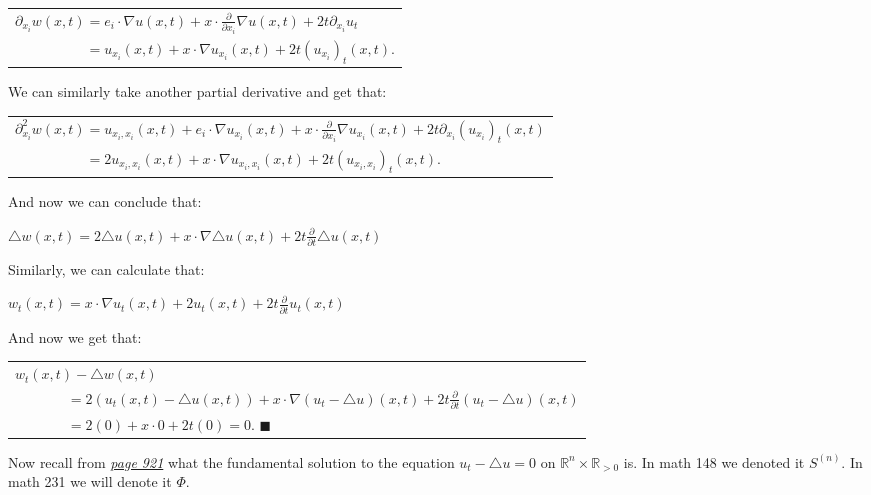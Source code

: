 \documentclass{book}
\newcommand{\inLinkRap}[2]{{\color{blue}\hyperlink{#1}{\textit{#2}}}}
\newcommand{\hTwo}{%
\color{Black}%
   \fontsize{13}{15}\selectfont%
}
\newenvironment{myIndent}{%
   \begin{adjustwidth}{2.5em}{0em}%
}{%
   \end{adjustwidth}%
}
\newcommand{\retTwo}{\hfill\bigbreak}
\begin{document}
\begin{enumerate}
\begin{myIndent}
		{\centering\begin{tabular}{l}
			$\partial_{x_i} w(x, t) = e_i \cdot \nabla u(x, t) + x \cdot \frac{\partial}{\partial x_i}\nabla u(x, t) + 2t\partial_{x_i} u_t$\\ [4pt]
			$\phantom{\partial_{x_i} w(x, t)} = u_{x_i}(x, t) + x \cdot \nabla u_{x_i}(x, t) + 2t(u_{x_i})_t(x, t)$.
		\end{tabular} \retTwo\par}

		We can similarly take another partial derivative and get that:

		{\centering\begin{tabular}{l}
			$\partial_{x_i}^2 w(x, t) = u_{x_i, x_i}(x, t) + e_i \cdot \nabla u_{x_i}(x, t) + x \cdot \frac{\partial}{\partial x_i}\nabla u_{x_i}(x, t) + 2t\partial_{x_i}(u_{x_i})_t(x, t)$\\ [4pt]
			$\phantom{\partial_{x_i}^2 w(x, t)} = 2u_{x_i, x_i}(x, t) + x \cdot \nabla u_{x_i, x_i}(x, t) + 2t(u_{x_i, x_i})_t(x, t)$.
		\end{tabular} \retTwo\par}

		And now we can conclude that:
		
		{\centering$\triangle w(x, t) = 2\triangle u(x, t) + x \cdot \nabla \triangle u(x ,t) + 2t \frac{\partial}{\partial t}\triangle u(x, t)$\retTwo\par}

		Similarly, we can calculate that:

		{\centering $w_t(x, t) = x \cdot \nabla u_t(x, t) + 2u_t(x, t) + 2t \frac{\partial}{\partial t}u_{t}(x, t)$ \retTwo\par}

		And now we get that:
		
		{\centering\begin{tabular}{l}
			$w_t(x, t) - \triangle w(x, t)$\\
			$\phantom{aaaaaaa} = 2(u_t(x, t) - \triangle u(x, t)) + x \cdot \nabla (u_t - \triangle u)(x, t) + 2t \frac{\partial}{\partial t}(u_t - \triangle u)(x, t)$\\ [10pt]
			$\phantom{aaaaaaa} = 2(0) + x \cdot 0 + 2t (0) = 0$. $\blacksquare$
		\end{tabular}\retTwo\par}
	\end{myIndent}
\end{enumerate}

\hTwo Now recall from \inLinkRap{Page 921 Fundamental Solution}{page 921} what the fundamental solution to the equation $u_t - \triangle u = 0$ on $\mathbb{R}^n \times \mathbb{R}_{> 0}$ is. In math 148 we denoted it $S^{(n)}$. In math 231 we will denote it $\Phi$.\newpage
\end{document}

